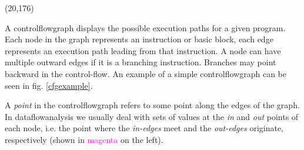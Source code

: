 \documentclass[bsc,twoside,singlespacing,parskip,logo,notimes,normalheadings]{infthesis}
\newcommand{\cfgpoint}[1][]{%
  \draw[magenta, fill=magenta!90] (#1) circle (0.5mm);
}
\begin{document}
        \begin{textblock}{80}(20,176)
            \captionsetup{width=8cm,justification=justified}
            \label{cfgexample}
        \end{textblock}

        \hfill\begin{minipage}{\dimexpr\textwidth-6cm}

          A \gls{controlflowgraph} displays the possible execution
          paths for a given program. Each node in the graph represents
          an instruction or basic block, each edge represents an
          execution path leading from that instruction. A node can
          have multiple outward edges if it is a branching
          instruction. Branches may point backward in the
          control-flow. An example of a simple \gls{controlflowgraph}
          can be seen in fig. \ref{cfgexample}.
          
          \vspace{0.26cm}

          A {\em point} in the \gls{controlflowgraph} refers to some
          point along the edges of the graph. In
          \gls{dataflowanalysis} we usually deal with sets of values
          at the {\em in} and {\em out} points of each node, i.e. the
          point where the {\em in-edges} meet and the {\em out-edges}
          originate, respectively (shown in
          \textcolor{magenta}{magenta} on the left).

        \end{minipage}
\end{document}
